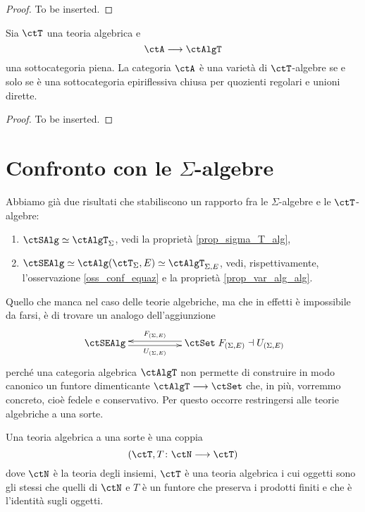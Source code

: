 \begin{proof}
	To be inserted.
\end{proof}

\begin{corollary}\label{cor_th_Birkhoff_AlgT}
	Sia \(\ctT\) una teoria algebrica e
	\[
		\ctA \fun \ctAlgT
	\]
	una sottocategoria piena. La categoria \(\ctA\) è una varietà di \(\ctT\)-algebre se e solo se è una sottocategoria epiriflessiva
	chiusa per quozienti regolari e unioni dirette.
\end{corollary}

\begin{proof}
	To be inserted.
\end{proof}

\section{Confronto con le \(\Sigma\)-algebre}\label{sec_confr_sigma_T}

Abbiamo già due risultati che stabiliscono un rapporto fra le \(\Sigma\)-algebre e le \(\ctT\)-algebre:
\begin{enumerate}
	\item \(\ctSAlg \simeq \ctAlgT_{\Sigma}\), vedi la proprietà \ref{prop_sigma_T_alg},
	\item \(\ctSEAlg \simeq \ctAlg(\ctT_{\Sigma},E) \simeq \ctAlgT_{\Sigma,E}\), vedi, rispettivamente, l'osservazione
	      \ref{oss_conf_equaz} e la proprietà \ref{prop_var_alg_alg}.
\end{enumerate}

Quello che manca nel caso delle teorie algebriche, ma che in effetti è impossibile da farsi, è di trovare un analogo
dell'aggiunzione
\[\xymatrix{\ctSEAlg \ar@<-0.5ex>[rr]_-{U_{(\Sigma,E)}} & & \ctSet \ar@<-0.5ex>[ll]_-{F_{(\Sigma,E)}}} F_{(\Sigma,E)} \dashv U_{(\Sigma,E)}\]
perché una categoria algebrica \(\ctAlgT\) non permette di construire in modo canonico un funtore dimenticante
\(\ctAlgT \fun \ctSet\) che, in più, vorremmo concreto, cioè fedele e conservativo. Per questo occorre restringersi alle
teorie algebriche a una sorte.

\begin{definition}\label{def_th_alg_unasorte}
	Una teoria algebrica a una sorte è una coppia
	\[
		(\ctT, T \colon \ctN \fun \ctT)
	\]
	dove \(\ctN\) è la teoria degli insiemi, \(\ctT\) è una teoria algebrica i cui oggetti sono gli stessi che quelli di \(\ctN\) e \(T\)
	è un funtore che preserva i prodotti finiti e che è l'identità sugli oggetti.
\end{definition}

